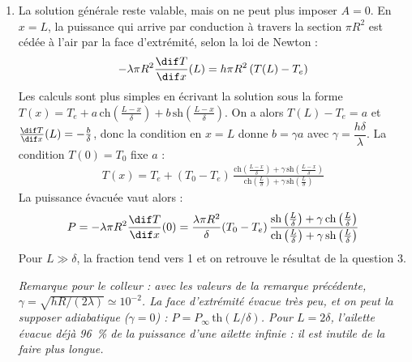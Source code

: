 \begin{correction}
\begin{enumerate}
	\textit{Remarque pour le colleur : pour une ailette en aluminium ($\lambda\simeq200$~W$\cdot$m$^{-1}\cdot$K$^{-1}$) de rayon $R=2$~mm, dans de l'air avec $h\simeq25$~W$\cdot$m$^{-2}\cdot$K$^{-1}$, on trouve $\delta\simeq9$~cm et $P/P_0\simeq90$. La longueur $\delta$ est du même ordre que celle des ailettes réelles : l'hypothèse $L\gg\delta$ n'est pas vérifiée en pratique, d'où la dernière question.}

	\item La solution générale reste valable, mais on ne peut plus imposer $A=0$. En $x=L$, la puissance qui arrive par conduction à travers la section $\pi R^2$ est cédée à l'air par la face d'extrémité, selon la loi de Newton :
	\begin{align*}
		-\lambda\pi R^2\frac{\dif T}{\dif x}(L)=h\pi R^2\left(T(L)-T_e\right)
	\end{align*}
	Les calculs sont plus simples en écrivant la solution sous la forme $T(x)=T_e+a\,\mathrm{ch}\left(\frac{L-x}{\delta}\right)+b\,\mathrm{sh}\left(\frac{L-x}{\delta}\right)$. On a alors $T(L)-T_e=a$ et $\frac{\dif T}{\dif x}(L)=-\frac{b}{\delta}$, donc la condition en $x=L$ donne $b=\gamma a$ avec $\gamma=\dfrac{h\delta}{\lambda}$. La condition $T(0)=T_0$ fixe $a$ :
	\begin{align*}
		\boxed{T(x)=T_e+(T_0-T_e)\,\frac{\mathrm{ch}\left(\frac{L-x}{\delta}\right)+\gamma\,\mathrm{sh}\left(\frac{L-x}{\delta}\right)}{\mathrm{ch}\left(\frac{L}{\delta}\right)+\gamma\,\mathrm{sh}\left(\frac{L}{\delta}\right)}}
	\end{align*}
	La puissance évacuée vaut alors :
	\begin{align*}
		P=-\lambda\pi R^2\frac{\dif T}{\dif x}(0)=\frac{\lambda\pi R^2}{\delta}(T_0-T_e)\,\frac{\mathrm{sh}\left(\frac{L}{\delta}\right)+\gamma\,\mathrm{ch}\left(\frac{L}{\delta}\right)}{\mathrm{ch}\left(\frac{L}{\delta}\right)+\gamma\,\mathrm{sh}\left(\frac{L}{\delta}\right)}
	\end{align*}
	Pour $L\gg\delta$, la fraction tend vers 1 et on retrouve le résultat de la question 3.

	\textit{Remarque pour le colleur : avec les valeurs de la remarque précédente, $\gamma=\sqrt{hR/(2\lambda)}\simeq10^{-2}$. La face d'extrémité évacue très peu, et on peut la supposer adiabatique ($\gamma=0$) : $P=P_\infty\,\mathrm{th}(L/\delta)$. Pour $L=2\delta$, l'ailette évacue déjà 96~\% de la puissance d'une ailette infinie : il est inutile de la faire plus longue.}

\end{enumerate}

\end{correction}

